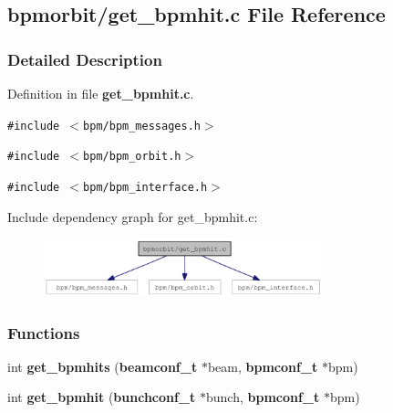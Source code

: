 \subsection{bpmorbit/get\_\-bpmhit.c File Reference}
\label{get__bpmhit_8c}


\subsubsection{Detailed Description}


Definition in file {\bf get\_\-bpmhit.c}.

{\tt \#include $<$bpm/bpm\_\-messages.h$>$}\par
{\tt \#include $<$bpm/bpm\_\-orbit.h$>$}\par
{\tt \#include $<$bpm/bpm\_\-interface.h$>$}\par


Include dependency graph for get\_\-bpmhit.c:\nopagebreak
\begin{figure}[H]
\begin{center}
\leavevmode
\includegraphics[width=229pt]{get__bpmhit_8c__incl}
\end{center}
\end{figure}
\subsubsection*{Functions}
\begin{CompactItemize}
\item 
int {\bf get\_\-bpmhits} ({\bf beamconf\_\-t} $\ast$beam, {\bf bpmconf\_\-t} $\ast$bpm)
\item 
int {\bf get\_\-bpmhit} ({\bf bunchconf\_\-t} $\ast$bunch, {\bf bpmconf\_\-t} $\ast$bpm)
\end{CompactItemize}
